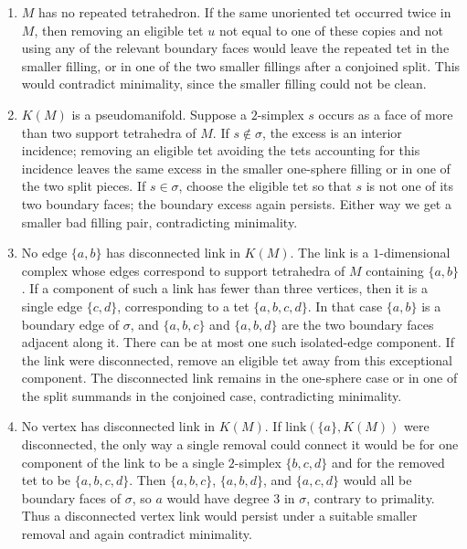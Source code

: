 \documentclass[12pt]{article}
\newcommand{\kw}{\mathrm}
\newcommand{\link}{\kw{link}}
\begin{document}
\begin{enumerate}
\item
$M$ has no repeated tetrahedron.
If the same unoriented tet occurred twice in $M$, then removing an eligible
tet $u$ not equal to one of these copies and not using any of the relevant
boundary faces would leave the repeated tet in the smaller filling, or in one
of the two smaller fillings after a conjoined split.  This would contradict
minimality, since the smaller filling could not be clean.

\item
$K(M)$ is a pseudomanifold.
Suppose a $2$-simplex $s$ occurs as a face of more than two support
tetrahedra of $M$.  If $s\notin \sigma$, the excess is an interior incidence;
removing an eligible tet avoiding the tets accounting for this incidence
leaves the same excess in the smaller one-sphere filling or in one of the two
split pieces.  If $s\in\sigma$, choose the eligible tet so that $s$ is not one
of its two boundary faces; the boundary excess again persists.  Either way
we get a smaller bad filling pair, contradicting minimality.

\item
No edge $\{a,b\}$ has disconnected link in $K(M)$.
The link is a $1$-dimensional complex whose edges correspond to support
tetrahedra of $M$ containing $\{a,b\}$.  If a component of such a link has
fewer than three vertices, then it is a single edge $\{c,d\}$, corresponding
to a tet $\{a,b,c,d\}$.  In that case $\{a,b\}$ is a boundary edge of
$\sigma$, and $\{a,b,c\}$ and $\{a,b,d\}$ are the two boundary faces adjacent
along it.  There can be at most one such isolated-edge component.  If the
link were disconnected, remove an eligible tet away from this exceptional
component.  The disconnected link remains in the one-sphere case or in one
of the split summands in the conjoined case, contradicting minimality.

\item
No vertex has disconnected link in $K(M)$.
If $\link(\{a\},K(M))$ were disconnected, the only way a single removal
could connect it would be for one component of the link to be a single
$2$-simplex $\{b,c,d\}$ and for the removed tet to be $\{a,b,c,d\}$.  Then
$\{a,b,c\}$, $\{a,b,d\}$, and $\{a,c,d\}$ would all be boundary faces of
$\sigma$, so $a$ would have degree $3$ in $\sigma$, contrary to primality.
Thus a disconnected vertex link would persist under a suitable smaller
removal and again contradict minimality.
\end{enumerate}
\end{document}

